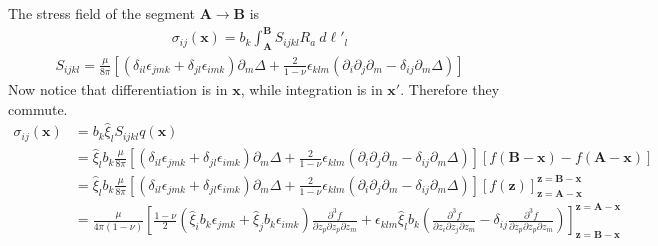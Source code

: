 \documentclass[10pt]{report}
\begin{document}
{The stress field of the segment $\bm A\rightarrow\bm B$ is
\begin{align}
\sigma_{ij}(\bm x)=b_k\int_{\bm A}^{\bm B}S_{ijkl}R_a\ d\ell'_l
\end{align}
\begin{align}
S_{ijkl}=\frac{\mu}{8\pi}\left[\left(\delta_{il}\epsilon_{jmk}+\delta_{jl}\epsilon_{imk}\right)\partial_m\Delta+\frac{2}{1-\nu}\epsilon_{klm}\left(\partial_{i}\partial_j\partial_m-\delta_{ij}\partial_m\Delta\right)\right]
\end{align}
Now notice that differentiation is in $\bm x$, while integration is in $\bm x'$. Therefore they commute. 
\begin{align}
\sigma_{ij}(\bm x)
&=b_k\hat{\xi}_lS_{ijkl}q(\bm x)\nonumber\\
&=\hat{\xi}_lb_k\frac{\mu}{8\pi}\left[\left(\delta_{il}\epsilon_{jmk}+\delta_{jl}\epsilon_{imk}\right)\partial_m\Delta+\frac{2}{1-\nu}\epsilon_{klm}\left(\partial_{i}\partial_j\partial_m-\delta_{ij}\partial_m\Delta\right)\right]\left[f(\bm B-\bm x)-f(\bm A-\bm x)\right]\nonumber\\
&=\hat{\xi}_lb_k\frac{\mu}{8\pi}\left[\left(\delta_{il}\epsilon_{jmk}+\delta_{jl}\epsilon_{imk}\right)\partial_m\Delta+\frac{2}{1-\nu}\epsilon_{klm}\left(\partial_{i}\partial_j\partial_m-\delta_{ij}\partial_m\Delta\right)\right]\left[f(\bm z)\right]^{\bm z=\bm B-\bm x}_{\bm z=\bm A-\bm x}\nonumber\\
&=\frac{\mu}{4\pi(1-\nu)}\left[\frac{1-\nu}{2}\left(\hat{\xi}_ib_k\epsilon_{jmk}+\hat{\xi}_jb_k\epsilon_{imk}\right)\frac{\partial^3 f}{\partial z_p\partial z_p\partial z_m}+\epsilon_{klm}\hat{\xi}_lb_k\left(\frac{\partial^3 f}{\partial z_i\partial z_j\partial z_m}-\delta_{ij}\frac{\partial^3 f}{\partial z_p\partial z_p\partial z_m}\right)\right]^{\bm z=\bm A-\bm x}_{\bm z=\bm B-\bm x}
\label{stressStraightDerivation}
\end{align}
 
}
\end{document}
